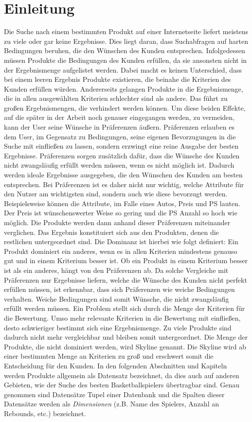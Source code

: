 \chapter{Einleitung}
\label{ch:Einleitung}
Die Suche nach einem bestimmten Produkt auf einer Internetseite liefert meistens zu viele oder gar keine Ergebnisse.  Dies liegt daran, dass Suchabfragen auf harten Bedingungen beruhen, die den Wünschen des Kunden entsprechen. Infolgedessen müssen Produkte die Bedingungen des Kunden erfüllen, da sie ansonsten nicht in der Ergebnismenge aufgelistet werden. Dabei macht es keinen Unterschied, dass bei einem leeren Ergebnis Produkte existieren, die beinahe die Kriterien des Kunden erfüllen würden. Andererseits gelangen Produkte in die Ergebnismenge, die in allen ausgewählten Kriterien schlechter sind als andere. Das führt zu großen Ergebnismengen, die verhindert werden können. Um diese beiden Effekte, auf die später in der Arbeit noch genauer eingegangen werden, zu vermeiden, kann der User seine Wünsche in Präferenzen äußern. Präferenzen erlauben es dem User, im Gegensatz zu Bedingungen, seine eigenen Bevorzugungen in die Suche mit einfließen zu lassen, sondern erzwingt eine reine Ausgabe der besten Ergebnisse. Präferenzen sorgen zusätzlich dafür, dass die Wünsche des Kunden nicht zwangsläufig erfüllt werden müssen, wenn es nicht möglich ist. Dadurch werden ideale Ergebnisse ausgegeben, die den Wünschen des Kunden am besten entsprechen.
Bei Präferenzen ist es daher nicht nur wichtig, welche Attribute für den Nutzer am wichtigsten sind, sondern auch wie diese bevorzugt werden. Beispielsweise können die Attribute, im Falle eines Autos, Preis und PS lauten. Der Preis ist wünschenswerter Weise so gering und die PS Anzahl so hoch wie möglich.
Die Produkte werden dann anhand dieser Präferenzen miteinander verglichen. Das Ergebnis konstituiert sich aus den  Produkten, denen die restlichen untergeordnet sind. Die Dominanz ist hierbei wie folgt definiert: Ein Produkt dominiert ein anderes, wenn es in allen Kriterien mindestens genauso gut und in einem Kriterium besser ist. Ob ein Produkt in einem Kriterium besser ist als ein anderes, hängt von den Präferenzen ab. Da solche Vergleiche mit Präferenzen nur Ergebnisse liefern, welche die Wünsche des Kunden nicht perfekt erfüllen müssen, ist erkennbar, dass sich Präferenzen wie weiche Bedingungen verhalten. Weiche Bedingungen sind somit Wünsche, die nicht zwangsläufig erfüllt werden müssen.
Ein Problem stellt sich durch die Menge der Kriterien für die Bewertung. Umso mehr relevante Kriterien in die Bewertung mit einfließen, desto schwieriger bestimmt sich eine Ergebnismenge. Zu viele Produkte sind dadurch nicht mehr vergleichbar und bleiben somit untergeordnet. Die Menge der Produkte, die nicht dominiert werden, wird Skyline genannt. Die Skyline wird ab einer bestimmten Menge an Kriterien zu groß und  erschwert somit die Entscheidung für den Kunden. 
In den folgenden Abschnitten und Kapiteln werden Produkte allgemein als Datensatz bezeichnet, da dies auch auf anderen Gebieten, wie der Suche des besten Basketballspielers übertragbar sind.
Genau genommen sind Datensätze Tupel einer Datenbank und die Spalten dieser Datensätze werden als \textit{Dimensionen} (z.B. Name des Spielers, Anzahl an Rebounds, etc.) bezeichnet.
